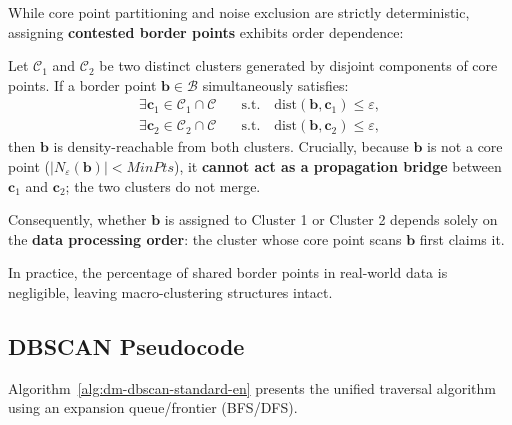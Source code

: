While core point partitioning and noise exclusion are strictly deterministic, assigning \textbf{contested border points} exhibits order dependence:

\begin{property}
Let $\mathcal{C}_1$ and $\mathcal{C}_2$ be two distinct clusters generated by disjoint components of core points. If a border point $\mathbf{b} \in \mathcal{B}$ simultaneously satisfies:
\begin{equation}
\begin{aligned}
    \exists \mathbf{c}_1 \in \mathcal{C}_1 \cap \mathcal{C} \quad &\text{s.t.} \quad \mathrm{dist}(\mathbf{b}, \mathbf{c}_1) \le \varepsilon, \\
    \exists \mathbf{c}_2 \in \mathcal{C}_2 \cap \mathcal{C} \quad &\text{s.t.} \quad \mathrm{dist}(\mathbf{b}, \mathbf{c}_2) \le \varepsilon,
\end{aligned}
\end{equation}
then $\mathbf{b}$ is density-reachable from both clusters.
Crucially, because $\mathbf{b}$ is not a core point ($|N_\varepsilon(\mathbf{b})| < MinPts$), it \textbf{cannot act as a propagation bridge} between $\mathbf{c}_1$ and $\mathbf{c}_2$; the two clusters do not merge.

Consequently, whether $\mathbf{b}$ is assigned to Cluster 1 or Cluster 2 depends solely on the \textbf{data processing order}: the cluster whose core point scans $\mathbf{b}$ first claims it.
\end{property}

In practice, the percentage of shared border points in real-world data is negligible, leaving macro-clustering structures intact.

\subsection{DBSCAN Pseudocode}

Algorithm~\ref{alg:dm-dbscan-standard-en} presents the unified traversal algorithm using an expansion queue/frontier (BFS/DFS).

